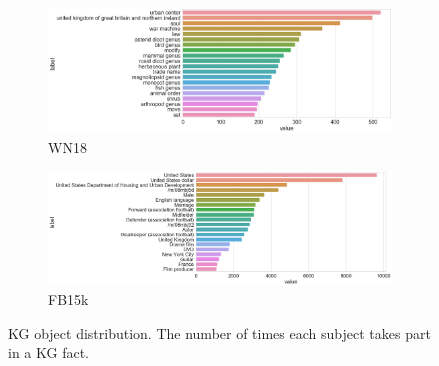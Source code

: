 \begin{figure}[H]
	\begin{subfigure}[b]{.5\linewidth}
   		\centering
    		\includegraphics[width=1.0\linewidth, height=0.7\linewidth]{WN18_Object_Counts}
		\captionsetup{justification=centering}
		\caption{WN18}
	\end{subfigure}
	\begin{subfigure}[b]{.5\linewidth}
   		\centering
		\includegraphics[width=1.0\linewidth, height=0.7\linewidth]{FB15k_Object_Counts}
		\captionsetup{justification=centering}
		\caption{FB15k}
	\end{subfigure}
	\captionsetup{justification=centering}
	\caption{KG object distribution. The number of times each subject takes part in a KG fact.}
\end{figure}

